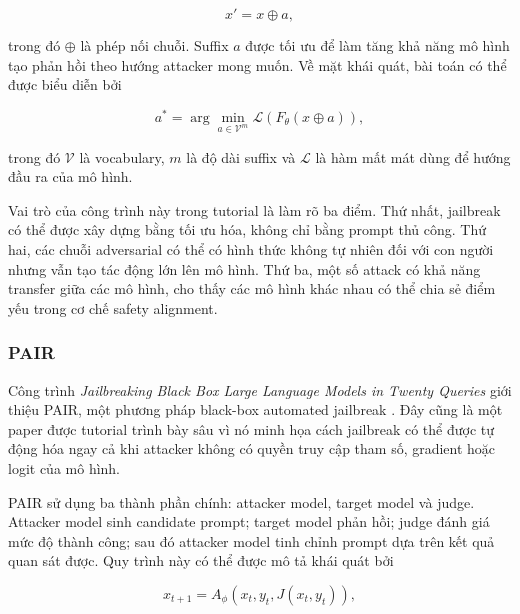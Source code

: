 \begin{equation}
    x' = x \oplus a,
    \label{eq:chapter7-gcg-input}
\end{equation}

trong đó $\oplus$ là phép nối chuỗi. Suffix $a$ được tối ưu để làm tăng
khả năng mô hình tạo phản hồi theo hướng attacker mong muốn. Về mặt khái
quát, bài toán có thể được biểu diễn bởi

\begin{equation}
    a^{*}
    =
    \arg\min_{a \in \mathcal{V}^{m}}
    \mathcal{L}
    \left(
        F_{\theta}(x \oplus a)
    \right),
    \label{eq:chapter7-gcg-objective}
\end{equation}

trong đó $\mathcal{V}$ là vocabulary, $m$ là độ dài suffix và
$\mathcal{L}$ là hàm mất mát dùng để hướng đầu ra của mô hình.

Vai trò của công trình này trong tutorial là làm rõ ba điểm. Thứ nhất,
jailbreak có thể được xây dựng bằng tối ưu hóa, không chỉ bằng prompt thủ
công. Thứ hai, các chuỗi adversarial có thể có hình thức không tự nhiên
đối với con người nhưng vẫn tạo tác động lớn lên mô hình. Thứ ba, một số
attack có khả năng transfer giữa các mô hình, cho thấy các mô hình khác
nhau có thể chia sẻ điểm yếu trong cơ chế safety alignment.

\subsubsection{PAIR}

Công trình \textit{Jailbreaking Black Box Large Language Models in Twenty
Queries} giới thiệu PAIR, một phương pháp black-box automated jailbreak
\cite{chao2023pair}. Đây cũng là một paper được tutorial trình bày sâu vì
nó minh họa cách jailbreak có thể được tự động hóa ngay cả khi attacker
không có quyền truy cập tham số, gradient hoặc logit của mô hình.

PAIR sử dụng ba thành phần chính: attacker model, target model và judge.
Attacker model sinh candidate prompt; target model phản hồi; judge đánh
giá mức độ thành công; sau đó attacker model tinh chỉnh prompt dựa trên
kết quả quan sát được. Quy trình này có thể được mô tả khái quát bởi

\begin{equation}
    x_{t+1}
    =
    A_{\phi}
    \left(
        x_t,
        y_t,
        J(x_t, y_t)
    \right),
    \label{eq:chapter7-pair-update}
\end{equation}

